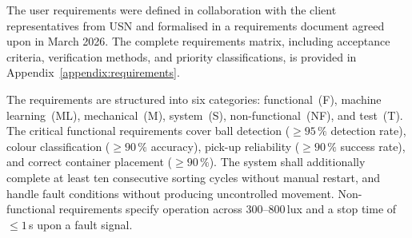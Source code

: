 
The user requirements were defined in collaboration with the client representatives
from USN and formalised in a requirements document agreed upon in March 2026. The
complete requirements matrix, including acceptance criteria, verification methods,
and priority classifications, is provided in Appendix~\ref{appendix:requirements}.

The requirements are structured into six categories: functional~(F), machine
learning~(ML), mechanical~(M), system~(S), non-functional~(NF), and test~(T). The
critical functional requirements cover ball detection ($\geq 95\,\%$ detection
rate), colour classification ($\geq 90\,\%$ accuracy), pick-up reliability
($\geq 90\,\%$ success rate), and correct container placement ($\geq 90\,\%$). The
system shall additionally complete at least ten consecutive sorting cycles without
manual restart, and handle fault conditions without producing uncontrolled movement.
Non-functional requirements specify operation across 300--800\,lux and a stop time
of $\leq 1$\,s upon a fault signal.